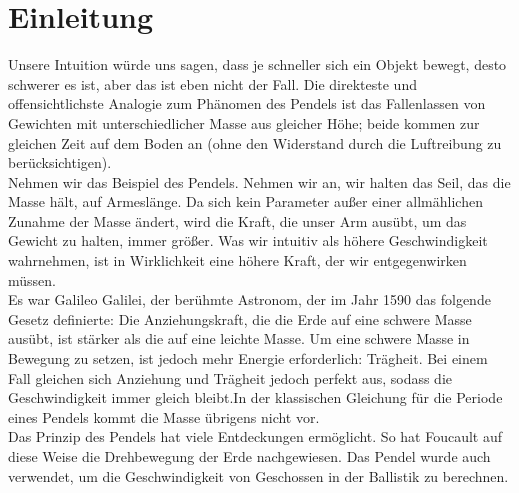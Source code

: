 \documentclass[12pt, a4paper, twoside]{article}
\begin{document}
    

    \section{Einleitung}
    Unsere Intuition würde uns sagen, dass je schneller sich ein Objekt bewegt, desto schwerer es ist, aber das ist eben nicht der Fall.
    Die direkteste und offensichtlichste Analogie zum Phänomen des Pendels ist das Fallenlassen von Gewichten mit unterschiedlicher Masse
    aus gleicher Höhe; beide kommen zur gleichen Zeit auf dem Boden an (ohne den Widerstand durch die Luftreibung zu berücksichtigen).\\
    
    Nehmen wir das Beispiel des Pendels. Nehmen wir an, wir halten das Seil, das die Masse hält, auf Armeslänge. Da sich kein Parameter außer einer
    allmählichen Zunahme der Masse ändert, wird die Kraft, die unser Arm ausübt, um das Gewicht zu halten, immer größer.  Was wir intuitiv als
    höhere Geschwindigkeit wahrnehmen, ist in Wirklichkeit eine höhere Kraft, der wir entgegenwirken müssen.\\

    Es war Galileo Galilei, der berühmte Astronom, der im Jahr 1590 das folgende Gesetz definierte: Die Anziehungskraft, die die Erde auf eine schwere Masse ausübt, ist stärker als die
    auf eine leichte Masse. Um eine schwere Masse in Bewegung zu setzen, ist jedoch mehr Energie erforderlich: Trägheit. Bei einem Fall gleichen
    sich Anziehung und Trägheit jedoch perfekt aus, sodass die Geschwindigkeit immer gleich bleibt.In der klassischen Gleichung für die Periode
    eines Pendels kommt die Masse übrigens nicht vor.\\ 

    Das Prinzip des Pendels hat viele Entdeckungen ermöglicht. So hat Foucault auf diese Weise die Drehbewegung der Erde nachgewiesen.
    Das Pendel wurde auch verwendet, um die Geschwindigkeit von Geschossen in der Ballistik zu berechnen.
    \pagebreak
\end{document}
